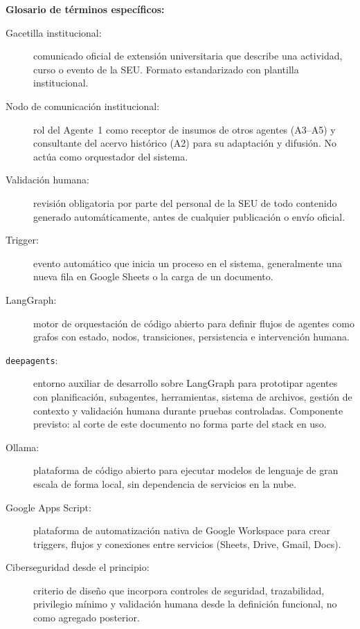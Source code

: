 \documentclass[a4paper, 12pt]{article}
\begin{document}
\noindent\textbf{Glosario de t\'erminos espec\'ificos:}

\begin{description}
  \item[Gacetilla institucional:] comunicado oficial de extensi\'on universitaria que describe una actividad, curso o evento de la \ac{SEU}. Formato estandarizado con plantilla institucional.
  \item[Nodo de comunicaci\'on institucional:] rol del Agente~1 como receptor de insumos de otros agentes (A3--A5) y consultante del acervo hist\'orico (A2) para su adaptaci\'on y difusi\'on. No act\'ua como orquestador del sistema.
  \item[Validaci\'on humana:] revisi\'on obligatoria por parte del personal de la \ac{SEU} de todo contenido generado autom\'aticamente, antes de cualquier publicaci\'on o env\'io oficial.
  \item[Trigger:] evento autom\'atico que inicia un proceso en el sistema, generalmente una nueva fila en Google Sheets o la carga de un documento.
  \item[LangGraph:] motor de orquestaci\'on de c\'odigo abierto para definir flujos de agentes como grafos con estado, nodos, transiciones, persistencia e intervenci\'on humana.
  \item[\texttt{deepagents}:] entorno auxiliar de desarrollo sobre LangGraph para prototipar agentes con planificaci\'on, subagentes, herramientas, sistema de archivos, gesti\'on de contexto y validaci\'on humana durante pruebas controladas. Componente previsto: al corte de este documento no forma parte del stack en uso.
  \item[Ollama:] plataforma de c\'odigo abierto para ejecutar modelos de lenguaje de gran escala de forma local, sin dependencia de servicios en la nube.
  \item[Google Apps Script:] plataforma de automatizaci\'on nativa de Google Workspace para crear triggers, flujos y conexiones entre servicios (Sheets, Drive, Gmail, Docs).
  \item[Ciberseguridad desde el principio:] criterio de dise\~no que incorpora controles de seguridad, trazabilidad, privilegio m\'inimo y validaci\'on humana desde la definici\'on funcional, no como agregado posterior.
\end{description}

\end{document}
